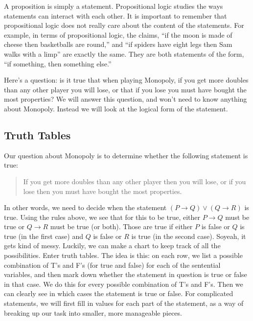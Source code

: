 \documentclass[10pt,]{book}
\theoremstyle{plain}
\theoremstyle{definition}
\theoremstyle{definition}
\theoremstyle{definition}
\numberwithin{equation}{chapter}
\def\imp{\rightarrow}
\begin{document}
      A proposition is simply a statement. Propositional logic studies the ways statements can interact with each other. It is important to remember that propositional logic does not really care about the content of the statements. For example, in terms of propositional logic, the claims, ``if the moon is made of cheese then basketballs are round,'' and ``if spiders have eight legs then Sam walks with a limp'' are exactly the same. They are both statements of the form, ``if \textlangle something\textrangle, then \textlangle something else\textrangle.''
\par

      Here's a question: is it true that when playing Monopoly, if you get more doubles than any other player you will lose, or that if you lose you must have bought the most properties? We will answer this question, and won't need to know anything about Monopoly. Instead we will look at the logical form of the statement.
%
\typeout{************************************************}
\typeout{************************************************}
\subsection[Truth Tables]{Truth Tables}\label{subsection-27}

\par

          Our question about Monopoly is to determine whether the following statement is true:
\begin{quote}
          If you get more doubles than any other player then you will lose, or if you lose then you must have bought the most properties.
        \end{quote}
\par

          In other words, we need to decide when the statement \((P \imp Q) \vee (Q \imp R)\) is true. Using the rules above, we see that for this to be true, either \(P \imp Q\) must be true or \(Q \imp R\) must be true (or both). Those are true if either \(P\) is false or \(Q\) is true (in the first case) and \(Q\) is false or \(R\) is true (in the second case). So\textemdash{}yeah, it gets kind of messy. Luckily, we can make a chart to keep track of all the possibilities. Enter truth tables. The idea is this: on each row, we list a possible combination of T's and F's (for true and false) for each of the sentential variables, and then mark down whether the statement in question is true or false in that case. We do this for every possible combination of T's and F's. Then we can clearly see in which cases the statement is true or false. For complicated statements, we will first fill in values for each part of the statement, as a way of breaking up our task into smaller,
          more manageable pieces.
\par
\end{document}
